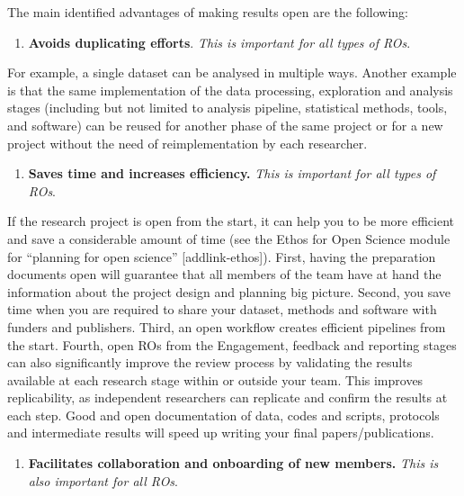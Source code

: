 \documentclass[
  letterpaper,
  DIV=11,
  numbers=noendperiod]{scrreport}
\providecommand{\tightlist}{%
  \setlength{\itemsep}{0pt}\setlength{\parskip}{0pt}}\usepackage{longtable,booktabs,array}
\begin{document}
The main identified advantages of making results open are the following:

\begin{enumerate}
\def\labelenumi{\arabic{enumi}.}
\tightlist
\item
  \textbf{Avoids duplicating efforts}.\hspace{0pt} \emph{This is
  important for all types of ROs}.
\end{enumerate}

For example, a single dataset can be analysed in multiple ways. Another
example is that the same implementation of the data processing,
exploration and analysis stages (including but not limited to analysis
pipeline, statistical methods, tools, and software) can be reused for
another phase of the same project or for a new project without the need
of reimplementation by each researcher.

\begin{enumerate}
\def\labelenumi{\arabic{enumi}.}
\tightlist
\item
  \textbf{Saves time and increases efficiency.} \emph{This is important
  for all types of ROs}.
\end{enumerate}

If the research project is open from the start, it can help you to be
more efficient and save a considerable amount of time (see the Ethos for
Open Science module for ``planning for open science''
{[}addlink-ethos{]}). First, having the preparation documents open will
guarantee that all members of the team have at hand the information
about the project design and planning big picture. Second, you save time
when you are required to share your dataset, methods and software with
funders and publishers. Third, an open workflow creates efficient
pipelines from the start. Fourth, open ROs from the Engagement, feedback
and reporting stages can also significantly improve the review process
by validating the results available at each research stage within or
outside your team. This improves replicability, as independent
researchers can replicate and confirm the results at each step. Good and
open documentation of data, codes and scripts, protocols and
intermediate results will speed up writing your final
papers/publications.

\begin{enumerate}
\def\labelenumi{\arabic{enumi}.}
\tightlist
\item
  \textbf{Facilitates collaboration and onboarding of new members.}
  \emph{This is also important for all ROs}.
\end{enumerate}
\end{document}
